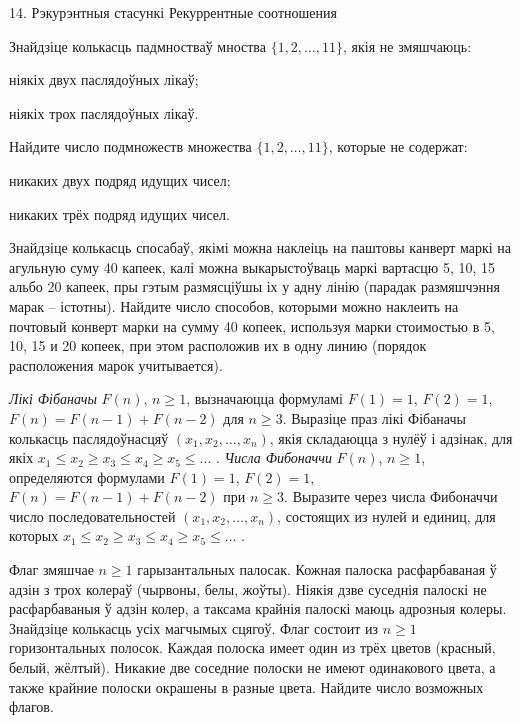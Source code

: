 



\biLangHeader
{14. Рэкурэнтныя стасункі}
{Рекуррентные соотношения}

\begin{problemList}

\problemItemSimple
{Знайдзіце колькасць падмностваў мноства $\{1, 2, \ldots, 11\}$, якія не змяшчаюць:
\begin{belarusianEnumerate}
  \item ніякіх двух паслядоўных лікаў;
  \item ніякіх трох паслядоўных лікаў.
\end{belarusianEnumerate}}
{Найдите число подмножеств множества $\{1, 2, \ldots, 11\}$, которые не содержат:
\begin{belarusianEnumerate}
  \item никаких двух подряд идущих чисел;
  \item никаких трёх подряд идущих чисел.
\end{belarusianEnumerate}}

\bigskip

\problemItemSimple
{Знайдзіце колькасць спосабаў, якімі можна наклеіць на паштовы канверт маркі на
агульную суму 40 капеек, калі можна выкарыстоўваць маркі вартасцю 5, 10, 15 альбо 20 капеек,
пры гэтым размясціўшы іх у адну лінію (парадак размяшчэння марак -- істотны).}
{Найдите число способов, которыми можно наклеить на почтовый конверт
марки на сумму 40 копеек, используя марки стоимостью в 5, 10, 15 и 20 копеек,
при этом расположив их в одну линию (порядок расположения марок учитывается).}

\problemItemSimple
{\emph{Лікі Фібаначы} $F(n)$, $n \ge 1$, вызначаюцца формуламі
$F(1) = 1$, $F(2) = 1$, $F(n) = F(n - 1) + F(n - 2)$ для $n \ge 3$.
Выразіце праз лікі Фібаначы колькасць паслядоўнасцяў $(x_1, x_2, \ldots, x_n)$,
якія складаюцца з нулёў і адзінак, для якіх
$x_1 \le x_2 \ge x_3 \le x_4 \ge x_5 \le \ldots\,\,$.}
{\emph{Числа Фибоначчи} $F(n)$, $n \ge 1$, определяются формулами
$F(1) = 1$, $F(2) = 1$, $F(n) = F(n - 1) + F(n - 2)$ при $n \ge 3$. Выразите
через числа Фибоначчи число последовательностей $(x_1, x_2, \ldots, x_n)$,
состоящих из нулей и единиц, для которых
$x_1 \le x_2 \ge x_3 \le x_4 \ge x_5 \le \ldots\,\,$.}

\problemItemSimple
{Флаг змяшчае $n \ge 1$ гарызантальных палосак. Кожная палоска расфарбаваная ў адзін з трох колераў (чырвоны, белы, жоўты).
Ніякія дзве суседнія палоскі не расфарбаваныя ў адзін колер, а таксама крайнія палоскі маюць адрозныя колеры.
Знайдзіце колькасць усіх магчымых сцягоў.}
{Флаг состоит из $n \ge 1$ горизонтальных полосок. Каждая полоска
имеет один из трёх цветов (красный, белый, жёлтый). Никакие две соседние полоски
не имеют одинакового цвета, а также крайние полоски окрашены в разные цвета.
Найдите число возможных флагов.}


\end{problemList}
